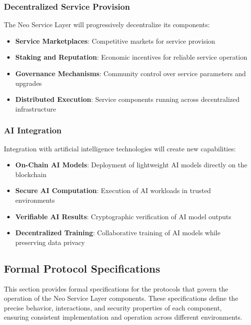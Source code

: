 \subsubsection{Decentralized Service Provision}
\label{subsubsec:decentralized-service}

The Neo Service Layer will progressively decentralize its components:

\begin{itemize}
    \item \textbf{Service Marketplaces}: Competitive markets for service provision
    \item \textbf{Staking and Reputation}: Economic incentives for reliable service operation
    \item \textbf{Governance Mechanisms}: Community control over service parameters and upgrades
    \item \textbf{Distributed Execution}: Service components running across decentralized infrastructure
\end{itemize}

\subsubsection{AI Integration}
\label{subsubsec:ai-integration}

Integration with artificial intelligence technologies will create new capabilities:

\begin{itemize}
    \item \textbf{On-Chain AI Models}: Deployment of lightweight AI models directly on the blockchain
    \item \textbf{Secure AI Computation}: Execution of AI workloads in trusted environments
    \item \textbf{Verifiable AI Results}: Cryptographic verification of AI model outputs
    \item \textbf{Decentralized Training}: Collaborative training of AI models while preserving data privacy
\end{itemize}

\subsection{Formal Protocol Specifications}
\label{subsec:formal-protocols}

This section provides formal specifications for the protocols that govern the operation of the Neo Service Layer components. These specifications define the precise behavior, interactions, and security properties of each component, ensuring consistent implementation and operation across different environments.

